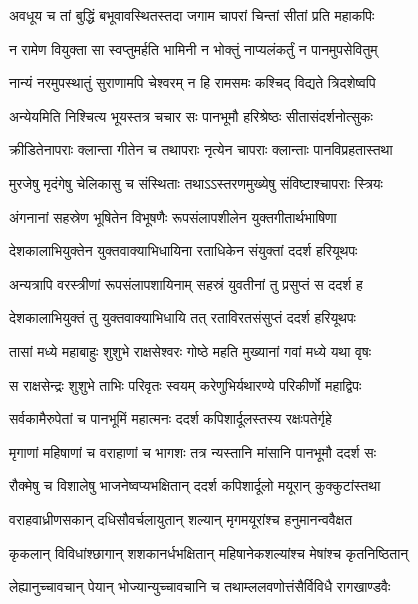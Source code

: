 
\twolineshloka
{अवधूय च तां बुद्धिं बभूवावस्थितस्तदा}
{जगाम चापरां चिन्तां सीतां प्रति महाकपिः} %

\twolineshloka
{न रामेण वियुक्ता सा स्वप्तुमर्हति भामिनी}
{न भोक्तुं नाप्यलंकर्तुं न पानमुपसेवितुम्} %

\twolineshloka
{नान्यं नरमुपस्थातुं सुराणामपि चेश्वरम्}
{न हि रामसमः कश्चिद् विद्यते त्रिदशेष्वपि} %

\twolineshloka
{अन्येयमिति निश्चित्य भूयस्तत्र चचार सः}
{पानभूमौ हरिश्रेष्ठः सीतासंदर्शनोत्सुकः} %

\twolineshloka
{क्रीडितेनापराः क्लान्ता गीतेन च तथापराः}
{नृत्येन चापराः क्लान्ताः पानविप्रहतास्तथा} %

\twolineshloka
{मुरजेषु मृदंगेषु चेलिकासु च संस्थिताः}
{तथाऽऽस्तरणमुख्येषु संविष्टाश्चापराः स्त्रियः} %

\twolineshloka
{अंगनानां सहस्रेण भूषितेन विभूषणैः}
{रूपसंलापशीलेन युक्तगीतार्थभाषिणा} %

\twolineshloka
{देशकालाभियुक्तेन युक्तवाक्याभिधायिना}
{रताधिकेन संयुक्तां ददर्श हरियूथपः} %

\twolineshloka
{अन्यत्रापि वरस्त्रीणां रूपसंलापशायिनाम्}
{सहस्रं युवतीनां तु प्रसुप्तं स ददर्श ह} %

\twolineshloka
{देशकालाभियुक्तं तु युक्तवाक्याभिधायि तत्}
{रताविरतसंसुप्तं ददर्श हरियूथपः} %

\twolineshloka
{तासां मध्ये महाबाहुः शुशुभे राक्षसेश्वरः}
{गोष्ठे महति मुख्यानां गवां मध्ये यथा वृषः} %

\twolineshloka
{स राक्षसेन्द्रः शुशुभे ताभिः परिवृतः स्वयम्}
{करेणुभिर्यथारण्ये परिकीर्णो महाद्विपः} %

\twolineshloka
{सर्वकामैरुपेतां च पानभूमिं महात्मनः}
{ददर्श कपिशार्दूलस्तस्य रक्षःपतेर्गृहे} %

\twolineshloka
{मृगाणां महिषाणां च वराहाणां च भागशः}
{तत्र न्यस्तानि मांसानि पानभूमौ ददर्श सः} %

\twolineshloka
{रौक्मेषु च विशालेषु भाजनेष्वप्यभक्षितान्}
{ददर्श कपिशार्दूलो मयूरान् कुक्कुटांस्तथा} %

\twolineshloka
{वराहवाध्रीणसकान् दधिसौवर्चलायुतान्}
{शल्यान् मृगमयूरांश्च हनुमानन्ववैक्षत} %

\twolineshloka
{कृकलान् विविधांश्छागान् शशकानर्धभक्षितान्}
{महिषानेकशल्यांश्च मेषांश्च कृतनिष्ठितान्} %

\twolineshloka
{लेह्यानुच्चावचान् पेयान् भोज्यान्युच्चावचानि च}
{तथाम्ललवणोत्तंसैर्विविधै रागखाण्डवैः} %

